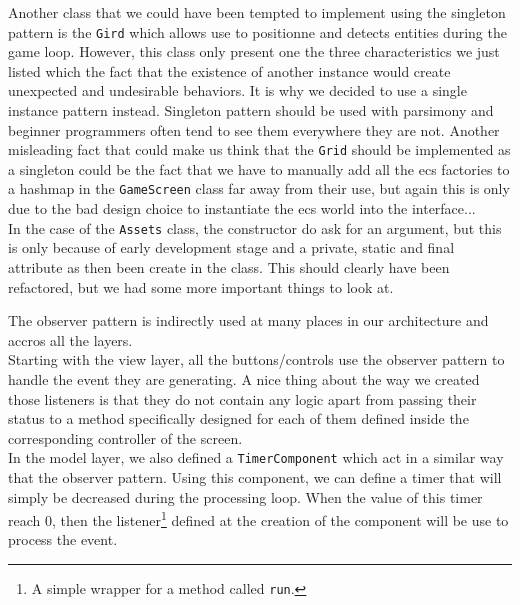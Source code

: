 Another class that we could have been tempted to implement using the singleton pattern is the \texttt{Gird} which allows use to positionne and detects entities during the game loop. However, this class only present one the three characteristics we just listed which the fact that the existence of another instance would create unexpected and undesirable behaviors. It is why we decided to use a single instance pattern instead. Singleton pattern should be used with parsimony and beginner programmers often tend to see them everywhere they are not. Another misleading fact that could make us think that the \texttt{Grid} should be implemented as a singleton could be the fact that we have to manually add all the \gls{ecs} factories to a hashmap in the \texttt{GameScreen} class far away from their use, but again this is only due to the bad design choice to instantiate the \gls{ecs} world into the interface... \\

In the case of the \texttt{Assets} class, the constructor do ask for an argument, but this is only because of early development stage and a private, static and final attribute as then been create in the class. This should clearly have been refactored, but we had some more important things to look at.


The observer pattern is indirectly used at many places in our architecture and accros all the layers. \\

Starting with the view layer, all the buttons/controls use the observer pattern to handle the event they are generating. A nice thing about the way we created those listeners is that they do not contain any logic apart from passing their status to a method specifically designed for each of them defined inside the corresponding controller of the screen. \\

In the model layer, we also defined a \texttt{TimerComponent} which act in a similar way that the observer pattern. Using this component, we can define a timer that will simply be decreased during the processing loop. When the value of this timer reach 0, then the listener\footnote{A simple wrapper for a method called \texttt{run}.} defined at the creation of the component will be use to process the event. \\

